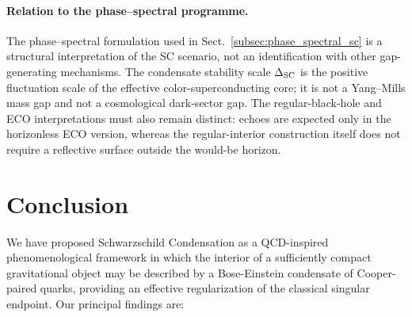 \documentclass[epj]{svjour}
\begin{document}
\paragraph{Relation to the phase--spectral programme.}
The phase--spectral formulation used in Sect.~\ref{subsec:phase_spectral_sc}
is a structural interpretation of the SC scenario, not an identification with
other gap-generating mechanisms. The condensate stability scale
$\Delta_{\rm SC}$ is the positive fluctuation scale of the effective
color-superconducting core; it is not a Yang--Mills mass gap and not a
cosmological dark-sector gap. The regular-black-hole and ECO interpretations
must also remain distinct: echoes are expected only in the horizonless ECO
version, whereas the regular-interior construction itself does not require a
reflective surface outside the would-be horizon.

\section{Conclusion}
\label{sec:conclusion}

We have proposed Schwarzschild Condensation as a QCD-inspired phenomenological framework in which the interior of a sufficiently compact gravitational object may be described by a Bose-Einstein condensate of Cooper-paired quarks, providing an effective regularization of the classical singular endpoint. Our principal findings are:
\end{document}
